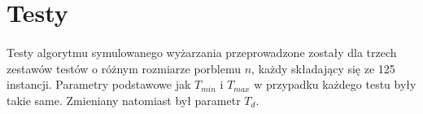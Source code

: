 \documentclass[wide,a4paper,titlepage,12pt] {article}
\begin{document}
\paragraph{}
\lstset{ %
    language=java,                %
    basicstyle=\scriptsize,       %
    numbers=left,                   %
    numberstyle=\scriptsize,      %
    stepnumber=10,                   %
    numbersep=9pt,                  %
    showspaces=false,               %
    showstringspaces=false,         %
    showtabs=false,                 %
    breaklines=true,                %
    }
    
  
\section{Testy}
\paragraph{}
Testy algorytmu symulowanego wyżarzania przeprowadzone zostały dla trzech zestawów testów o różnym rozmiarze porblemu $n$, każdy składający się ze 125 instancji. Parametry podstawowe jak $T_{min}$ i $T_{max}$ w przypadku każdego testu były takie same. Zmieniany natomiast był parametr $T_{d}$.
\end{document}
